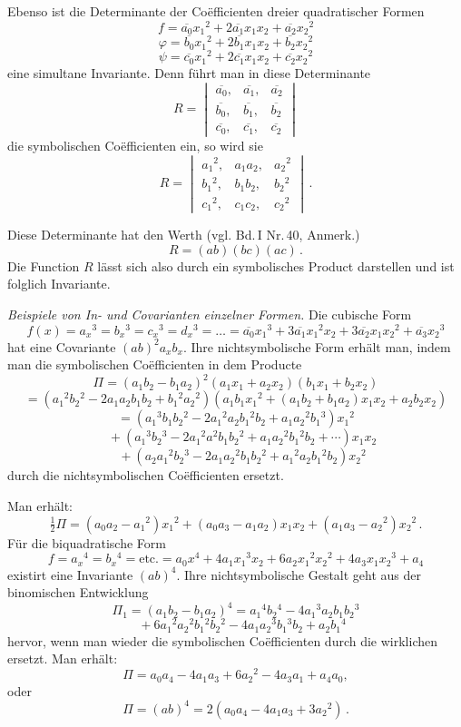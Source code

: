 \documentclass[11pt]{article}
\providecommand{\weberpage}[1]{}
\let\Pi\varPi
\begin{document}
Ebenso ist die Determinante der Co\"efficienten dreier
quadratischer Formen
\[
f = \overline{a_0}x_1{}^2+2\overline{a_1}x_1x_2+\overline{a_2}x_2{}^2
\]
\[
\varphi = \overline{b_0}x_1{}^2+2\overline{b_1}x_1x_2+\overline{b_2}x_2{}^2
\]
\[
\psi = \overline{c_0}x_1{}^2+2\overline{c_1}x_1x_2+\overline{c_2}x_2{}^2
\]
eine simultane Invariante. Denn führt man in diese Determinante
\[
R = \begin{vmatrix}
\overline{a_0}, & \overline{a_1}, & \overline{a_2}\\
\overline{b_0}, & \overline{b_1}, & \overline{b_2}\\
\overline{c_0}, & \overline{c_1}, & \overline{c_2}
\end{vmatrix}
\]
die symbolischen Co\"efficienten ein, so wird sie
\[
R = \begin{vmatrix}
a_1{}^2, & a_1a_2, & a_2{}^2\\
b_1{}^2, & b_1b_2, & b_2{}^2\\
c_1{}^2, & c_1c_2, & c_2{}^2
\end{vmatrix}\,.
\]


\weberpage{8}
Diese Determinante hat den Werth (vgl. Bd.\,I Nr.\,40, Anmerk.)
\[
R = (ab)(bc)(ac)\,.
\]
Die Function $R$ lässt sich also durch ein symbolisches Product
darstellen und ist folglich Invariante.

\textit{Beispiele von In- und Covarianten einzelner Formen.} Die
cubische Form
\[
f(x) = a_x{}^3 = b_x{}^3 = c_x{}^3 = d_x{}^3 = \ldots =
\overline{a_0}x_1{}^3+3\overline{a_1}x_1{}^2x_2+3\overline{a_2}x_1x_2{}^2+\overline{a_3}x_2{}^3
\]
hat eine Covariante $(ab)^2a_xb_x$. Ihre nichtsymbolische Form
erhält man, indem man die symbolischen Co\"efficienten in dem
Producte
\[
\Pi = (a_1b_2-b_1a_2)^2(a_1x_1+a_2x_2)(b_1x_1+b_2x_2)
\]
\[
= (a_1{}^2b_2{}^2-2a_1a_2b_1b_2+b_1{}^2a_2{}^2)(a_1b_1x_1{}^2+(a_1b_2+b_1a_2)x_1x_2+a_2b_2x_2) %
\]
\[
= (a_1{}^3b_1b_2{}^2-2a_1{}^2a_2b_1{}^2b_2+a_1a_2{}^2b_1{}^3)x_1{}^2
\]
\[
\quad + (a_1{}^3b_2{}^3-2a_1{}^2a^2b_1b_2{}^2+a_1a_2{}^2b_1{}^2b_2+\cdots)x_1x_2 %
\]
\[
\quad + (a_2a_1{}^2b_2{}^3-2a_1a_2{}^2b_1b_2{}^2+a_1{}^2a_2b_1{}^2b_2)x_2{}^2
\]
durch die nichtsymbolischen Co\"efficienten ersetzt.

Man erhält:
\[
\tfrac{1}{2}\Pi = (a_0a_2-a_1{}^2)x_1{}^2+(a_0a_3-a_1a_2)x_1x_2+(a_1a_3-a_2{}^2)x_2{}^2\,.
\]
Für die biquadratische Form
\[
f = a_x{}^4 = b_x{}^4 = \text{etc.} =
a_0x^4+4a_1x_1{}^3x_2+6a_2x_1{}^2x_2{}^2+4a_3x_1x_2{}^3+a_4 %
\]
existirt eine Invariante $(ab)^4$. Ihre nichtsymbolische Gestalt
geht aus der binomischen Entwicklung
\[
\Pi_1 = (a_1b_2-b_1a_2)^4 = a_1{}^4b_2{}^4-4a_1{}^3a_2b_1b_2{}^3
\]
\[
\quad + 6a_1{}^2a_2{}^2b_1{}^2b_2{}^2-4a_1a_2{}^3b_1{}^3b_2+a_2b_1{}^4
\]
hervor, wenn man wieder die symbolischen Co\"efficienten durch
die wirklichen ersetzt. Man erhält:
\[
\Pi = a_0a_4-4a_1a_3+6a_2{}^2-4a_3a_1+a_4a_0,
\]
oder
\[
\Pi = (ab)^4 = 2(a_0a_4-4a_1a_3+3a_2{}^2)\,.
\]
\end{document}
